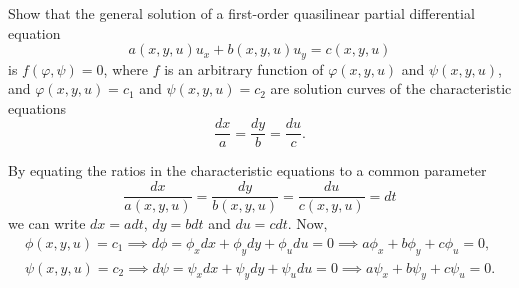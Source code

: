\documentclass[11pt]{penrose}
\begin{document}
\begin{problem}{4}
    Show that the general solution of a first-order quasilinear partial differential equation
    \begin{equation*}
        a(x,y,u) u_x + b(x,y,u) u_y = c(x,y,u)
    \end{equation*}
    is $f(\varphi, \psi) = 0$, where $f$ is an arbitrary function of $\varphi(x,y,u)$ and $\psi(x,y,u)$, and $\varphi(x,y,u) = c_1$ and $\psi(x,y,u) = c_2$ are solution curves of the characteristic equations
    \begin{equation*}
        \frac{dx}{a} = \frac{dy}{b} = \frac{du}{c}.
    \end{equation*}

    \solution By equating the ratios in the characteristic equations to a common parameter
    \begin{equation*}
        \frac{dx}{a(x,y,u)} = \frac{dy}{b(x,y,u)} = \frac{du}{c(x,y,u)} = dt
    \end{equation*}
    we can write $dx = a dt$, $dy = b dt$ and $du = c dt$. Now,
    \begin{gather*}
        \phi(x,y,u) = c_1
        \implies
        d\phi = \phi_x dx + \phi_y dy + \phi_u du = 0
        \implies
        a \phi_x + b \phi_y + c \phi_u = 0,\\
        \psi(x,y,u) = c_2
        \implies
        d\psi = \psi_x dx + \psi_y dy + \psi_u du = 0
        \implies
        a \psi_x + b \psi_y + c \psi_u = 0.
    \end{gather*}


\end{problem}
\end{document}
